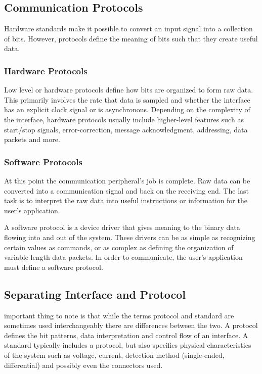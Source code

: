\documentclass[11pt,fleqn]{book} %
\begin{document}
\subsection{Communication Protocols}
Hardware standards make it possible to convert an input signal into a collection of bits. However, protocols define the meaning of bits such that they create useful data. 

\subsubsection{Hardware Protocols}
Low level or hardware protocols define how bits are organized to form raw data. This primarily involves the rate that data is sampled and whether the interface has an explicit clock signal or is asynchronous.
Depending on the complexity of the interface, hardware protocols usually include higher-level features such as start/stop signals, error-correction, message acknowledgment, addressing, data packets and more.

\subsubsection{Software Protocols}	
At this point the communication peripheral's job is complete. Raw data can be converted into a communication signal and back on the receiving end. The last task is to interpret the raw data into useful instructions or information for the user's application.

A software protocol is a device driver that gives meaning to the binary data flowing into and out of the system. These drivers can be as simple as recognizing certain values as commands, or as complex as defining the organization of variable-length data packets.  In order to communicate, the user's application must define a software protocol. 

\subsection{Separating Interface and Protocol}


important thing to note is that while the terms protocol and standard are sometimes used interchangeably there are differences between the two. A protocol defines the bit patterns, data interpretation and control flow of an interface. A standard typically includes a protocol, but also specifies physical characteristics of the system such as voltage, current, detection method (single-ended, differential) and possibly even the connectors used.
\end{document}

